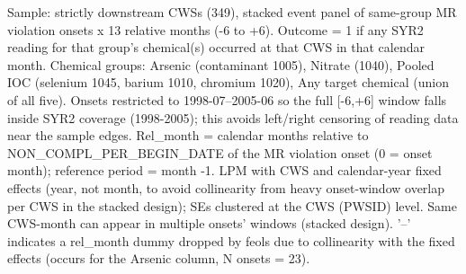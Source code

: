 \begin{table}[htbp]
      {\tiny\linespread{1}\selectfont \par \raggedright Sample: strictly downstream CWSs (349), stacked event panel of same-group MR violation onsets x 13 relative months (-6 to +6). Outcome = 1 if any SYR2 reading for that group's chemical(s) occurred at that CWS in that calendar month. Chemical groups: Arsenic (contaminant 1005), Nitrate (1040), Pooled IOC (selenium 1045, barium 1010, chromium 1020), Any target chemical (union of all five). Onsets restricted to 1998-07--2005-06 so the full [-6,+6] window falls inside SYR2 coverage (1998-2005); this avoids left/right censoring of reading data near the sample edges. Rel\_month = calendar months relative to NON\_COMPL\_PER\_BEGIN\_DATE of the MR violation onset (0 = onset month); reference period = month -1. LPM with CWS and calendar-year fixed effects (year, not month, to avoid collinearity from heavy onset-window overlap per CWS in the stacked design); SEs clustered at the CWS (PWSID) level. Same CWS-month can appear in multiple onsets' windows (stacked design). '--' indicates a rel\_month dummy dropped by feols due to collinearity with the fixed effects (occurs for the Arsenic column, N onsets = 23).}
\end{table}

